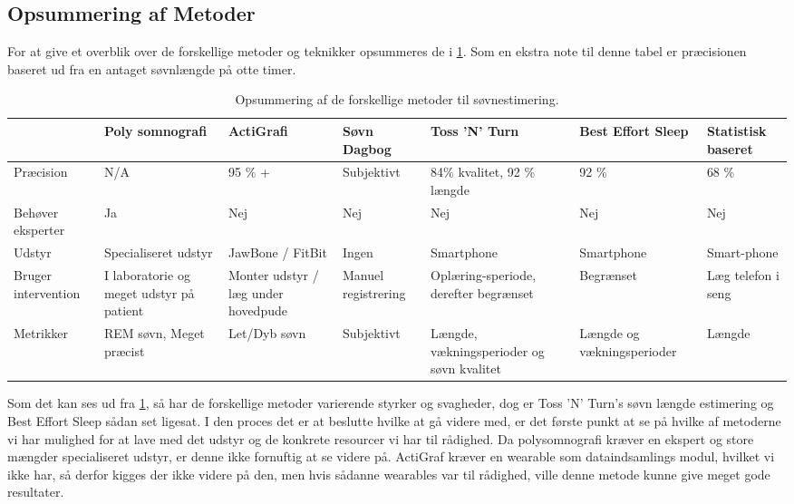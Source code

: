 \subsection{Opsummering af Metoder}
For at give et overblik over de forskellige metoder og teknikker opsummeres de i \cref{tab:opsummeringMetoder}.
Som en ekstra note til denne tabel er præcisionen baseret ud fra en antaget søvnlængde på otte timer. 

\begin{table}[h]
\begin{tabular}{|p{1.5cm}|p{2cm}|p{2cm}|p{2cm}|p{2cm}|p{2cm}|p{1.5cm}|}
\hline & Poly somnografi & ActiGrafi & Søvn Dagbog & Toss 'N' Turn & Best Effort Sleep  & Statistisk baseret\\ 
\hline Præcision & N/A & 95 \% + & Subjektivt & 84\% kvalitet, 92 \% længde & 92 \% & 68 \%\\ 
\hline Behøver eksperter & Ja & Nej & Nej & Nej & Nej & Nej \\ 
\hline Udstyr & Specialiseret udstyr & JawBone / FitBit & Ingen & Smartphone & Smartphone & Smart-phone \\ 
\hline Bruger intervention	& I laboratorie og meget udstyr på patient	& Monter udstyr / læg under hovedpude & Manuel registrering  & Oplæring-speriode, derefter begrænset & Begrænset & Læg telefon i seng \\ 
\hline Metrikker & REM søvn, Meget præcist	& Let/Dyb søvn & Subjektivt & Længde, vækningsperioder og søvn kvalitet & Længde og vækningsperioder & Længde \\ 
\hline 
\end{tabular}
\caption{Opsummering af de forskellige metoder til søvnestimering.}
\label{tab:opsummeringMetoder}
\end{table}
Som det kan ses ud fra \cref{tab:opsummeringMetoder}, så har de forskellige metoder varierende styrker og svagheder, dog er Toss 'N' Turn's søvn længde estimering og Best Effort Sleep sådan set ligesat.
I den proces det er at beslutte hvilke at gå videre med, er det første punkt at se på hvilke af metoderne vi har mulighed for at lave med det udstyr og de konkrete resourcer vi har til rådighed.
Da polysomnografi kræver en ekspert og store mængder specialiseret udstyr, er denne ikke fornuftig at se videre på.
ActiGraf kræver en wearable som dataindsamlings modul, hvilket vi ikke har, så derfor kigges der ikke videre på den, men hvis sådanne wearables var til rådighed, ville denne metode kunne give meget gode resultater.

